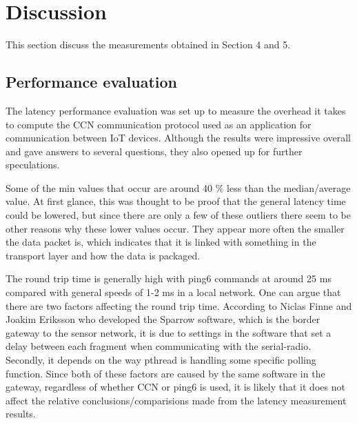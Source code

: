 \section{Discussion}
This section discuss the measurements obtained in Section 4 and 5. %
\subsection{Performance evaluation}
The latency performance evaluation was set up to measure the overhead it takes to compute the CCN communication protocol used as an application for communication between IoT devices. Although the results were impressive overall and gave answers to several questions, they also opened up for further speculations.

Some of the min values that occur are around 40 $\%$ less than the median/average value. At first glance, this was thought to be proof that the general latency time could be lowered, but since there are only a few of these outliers there seem to be other reasons why these lower values occur. They appear more often the smaller the data packet is, which indicates that it is linked with something in the transport layer and how the data is packaged.
%

The round trip time is generally high with ping6 commands at around 25 ms compared with general speeds of 1-2 ms in a local network. One can argue that there are two factors affecting the round trip time. According to Niclas Finne and Joakim Eriksson who developed the Sparrow software, which is the border gateway to the sensor network, it is due to settings in the software that set a delay between each fragment when communicating with the serial-radio. Secondly, it depends on the way pthread is handling some specific polling function. Since both of these factors are caused by the same software in the gateway, regardless of whether CCN or ping6 is used, it is likely that it does not affect the relative conclusions/comparisions made from the latency measurement results.



